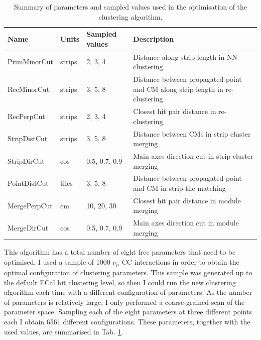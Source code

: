 \begin{table}[t]
	\caption{Summary of parameters and sampled values used in the optimisation of the clustering algorithm.}
	\begin{center}
		\begin{small}
			\begin{tabular}{l|l|l|p{7cm}}
				Name         & Units  & Sampled values & Description                                                                  \\[2mm] \hline
				\rule{0pt}{1.1\normalbaselineskip}PrimMinorCut & strips & 2, 3, 4        & Distance along strip length in NN clustering                                 \\[3mm]
				RecMinorCut  & strips & 3, 5, 8        & Distance between propagated point and CM along strip length in re-clustering \\[8mm]
				RecPerpCut   & strips & 2, 3, 4        & Closest hit pair distance in re-clustering                                   \\[3mm]
				StripDistCut & strips & 3, 5, 8        & Distance between CMs in strip cluster merging                                \\[3mm]
				StripDirCut  & cos    & 0.5, 0.7, 0.9  & Main axes direction cut in strip cluster merging                             \\[3mm]
				PointDistCut & tiles  & 3, 5, 8        & Distance between propagated point and CM in strip-tile matching              \\[8mm]
				MergePerpCut & cm     & 10, 20, 30     & Closest hit pair distance in module merging                                  \\[3mm]
				MergeDirCut  & cos    & 0.5, 0.7, 0.9  & Main axes direction cut in module merging                                   
			\end{tabular}
		\end{small}
	\end{center}
	\label{tab:clustering_optimisation}
\end{table}

This algorithm has a total number of eight free parameters that need to be optimised. I used a sample of 1000 $\nu_{\mu}$ CC interactions in order to obtain the optimal configuration of clustering parameters. This sample was generated up to the default ECal hit clustering level, so then I could run the new clustering algorithm each time with a different configuration of parameters. As the number of parameters is relatively large, I only performed a coarse-grained scan of the parameter space. Sampling each of the eight parameters at three different points each I obtain 6561 different configurations. These parameters, together with the used values, are summarised in Tab. \ref{tab:clustering_optimisation}.

